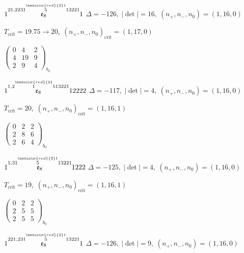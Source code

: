 \documentclass[10pt]{article}
\begin{document}
\smallskip

$1\overset{21,2231\overset{\textcolor{red}{2}1}{5}13221}{\mathfrak{e}_8}1$ \quad $\Delta=-126,\; |\det|=16,\; (n_+,n_-,n_0)=(1,16,0)$

\hspace{1em}$T_{\text{crit}}=19.75 \to 20,\; (n_+,n_-,n_0)_{\text{crit}}=(1,17,0)$

\hspace{2em}$\left(\begin{smallmatrix}0 & 4 & 2 \\ 4 & 19 & 9 \\ 2 & 9 & 4\end{smallmatrix}\right)_{\!b_0}$

\smallskip

$1\overset{1,2\overset{\textcolor{red}{2}}{1}513221}{\mathfrak{e}_8}12222$ \quad $\Delta=-117,\; |\det|=4,\; (n_+,n_-,n_0)=(1,16,0)$

\hspace{1em}$T_{\text{crit}}=20,\; (n_+,n_-,n_0)_{\text{crit}}=(1,16,1)$

\hspace{2em}$\left(\begin{smallmatrix}0 & 2 & 2 \\ 2 & 8 & 6 \\ 2 & 6 & 4\end{smallmatrix}\right)_{\!b_0}$

\smallskip

$1\overset{1,31\overset{\textcolor{red}{2}1}{5}13221}{\mathfrak{e}_8}1222$ \quad $\Delta=-125,\; |\det|=4,\; (n_+,n_-,n_0)=(1,16,0)$

\hspace{1em}$T_{\text{crit}}=19,\; (n_+,n_-,n_0)_{\text{crit}}=(1,16,1)$

\hspace{2em}$\left(\begin{smallmatrix}0 & 2 & 2 \\ 2 & 5 & 5 \\ 2 & 5 & 5\end{smallmatrix}\right)_{\!b_0}$

\smallskip

$1\overset{221,231\overset{\textcolor{red}{2}1}{5}13221}{\mathfrak{e}_8}1$ \quad $\Delta=-126,\; |\det|=9,\; (n_+,n_-,n_0)=(1,16,0)$
\end{document}
